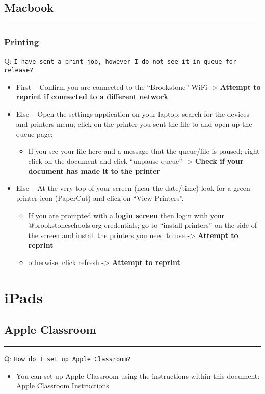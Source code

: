 \documentclass[11pt]{article}
\begin{document}
\clearpage
\subsection{Macbook}
\label{sec:org60826e3}
\noindent\rule{\textwidth}{0.5pt}
\subsubsection{Printing}
\label{sec:orgbf02145}
Q: \texttt{I have sent a print job, however I do not see it in queue for release?}
\begin{itemize}
\item First -- Confirm you are connected to the ``Brookstone'' WiFi -> \textbf{Attempt to reprint if connected to a different network}
\item Else -- Open the settings application on your laptop; search for the devices and printers menu; click on the printer you sent the file to and open up the queue page:
\begin{itemize}
\item If you see your file here and a message that the queue/file is paused; right click on the document and click ``unpause queue'' -> \textbf{Check if your document has made it to the printer}
\end{itemize}

\item Else -- At the very top of your screen (near the date/time) look for a green printer icon (PaperCut) and click on ``View Printers''.
\begin{itemize}
\item If you are prompted with a \textbf{login screen} then login with your @brookstoneschools.org credentials; go to ``install printers'' on the side of the screen and install the printers you need to use -> \textbf{Attempt to reprint}
\item otherwise, click refresh -> \textbf{Attempt to reprint}
\end{itemize}
\end{itemize}


\clearpage
\section{iPads}
\label{sec:org7ddbd49}
\subsection{Apple Classroom}
\label{sec:orgb2e7136}
\noindent\rule{\textwidth}{0.5pt}
Q: \texttt{How do I set up Apple Classroom?}
\begin{itemize}
\item You can set up Apple Classroom using the instructions within this document: \href{https://docs.google.com/document/d/1VQ7f4V\_Gj16oRHccW3Lk0xK8nFByXDQ\_1gwRT2M16BY/edit?usp=sharing}{Apple Classroom Instructions}
\end{itemize}
\end{document}
